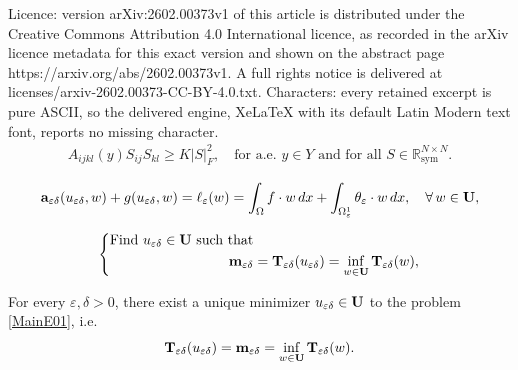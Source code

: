 \documentclass[10pt,a4paper]{amsart}
\def\GT{{\bf T}}
\def\GU{{\bf U}}
\def\Ga{{\bf a}}
\def\Gm{{\bf m}}
\def\O{\Omega}
\def\R{{\mathbb{R}}}
\def\X{\times }
\def\d{\delta}
\def\ed{{\varepsilon\delta}}
\def\e{\varepsilon}
\def\sy{\text{sym}}
\begin{document}
Licence: version arXiv:2602.00373v1 of this article is distributed under the Creative Commons Attribution 4.0 International licence, as recorded in the arXiv licence metadata for this exact version and shown on the abstract page https://arxiv.org/abs/2602.00373v1. A full rights notice is delivered at licenses/arxiv-2602.00373-CC-BY-4.0.txt. Characters: every retained excerpt is pure ASCII, so the delivered engine, XeLaTeX with its default Latin Modern text font, reports no missing character.
	\begin{equation}\label{Coe01}
		\begin{aligned}
			A_{ijkl}(y) S_{ij} S_{kl}\geq K| S|^2_F,\quad \text{for a.e. $y\in Y$ and for all $S\in \R^{N\X N}_\sy$}.
		\end{aligned}	
	\end{equation}

\begin{equation}\label{MainW01}
\Ga_\ed(u_\ed,w)+g(u_\ed,w)=\ell_\e(w)=\int_\O f\cdot w\,dx+\int_{\O^1_\e}\theta_\e\cdot w\,dx,\quad \forall\,w\in \GU,
\end{equation}

\begin{equation}\label{MainE01}
	\left\{\begin{aligned}
		&\text{Find $u_\ed\in\GU$ such that}\\
		&\hskip 3cm\Gm_\ed=\GT_\ed(u_\ed)=\inf_{w\in\GU}\GT_\ed(w),
	\end{aligned}\right.
\end{equation}

\begin{theorem}\label{Th1}
	For every $\e,\d>0$, there exist a unique minimizer $u_\ed\in \GU$ to the problem \eqref{MainE01}, i.e.
	$$\GT_\ed(u_\ed)=\Gm_\ed=\inf_{w\in\GU}\GT_\ed(w).$$
\end{theorem}
\end{document}
